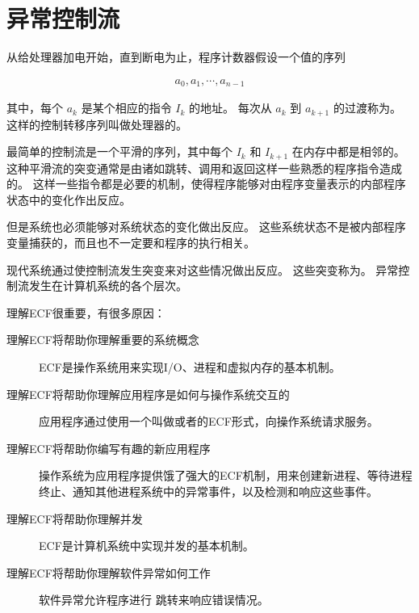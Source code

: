
\chapter{异常控制流}
{
    从给处理器加电开始，直到断电为止，程序计数器假设一个值的序列

    \begin{align*}
        a_0, a_1, \cdots, a_{n -1}
    \end{align*}

    其中，每个 $a_k$ 是某个相应的指令 $I_k$ 的地址。
    每次从 $a_k$ 到 $a_{k + 1}$ 的过渡称为。
    这样的控制转移序列叫做处理器的。

    最简单的控制流是一个平滑的序列，其中每个 $I_k$ 和 $I_{k + 1}$ 在内存中都是相邻的。
    这种平滑流的突变通常是由诸如跳转、调用和返回这样一些熟悉的程序指令造成的。
    这样一些指令都是必要的机制，使得程序能够对由程序变量表示的内部程序状态中的变化作出反应。

    但是系统也必须能够对系统状态的变化做出反应。
    这些系统状态不是被内部程序变量捕获的，而且也不一定要和程序的执行相关。

    现代系统通过使控制流发生突变来对这些情况做出反应。
    这些突变称为。
    异常控制流发生在计算机系统的各个层次。

    理解ECF很重要，有很多原因：

    \begin{description}
        \item[理解ECF将帮助你理解重要的系统概念] ECF是操作系统用来实现I/O、进程和虚拟内存的基本机制。
        \item[理解ECF将帮助你理解应用程序是如何与操作系统交互的] 应用程序通过使用一个叫做或者的ECF形式，向操作系统请求服务。
        \item[理解ECF将帮助你编写有趣的新应用程序] 操作系统为应用程序提供饿了强大的ECF机制，用来创建新进程、等待进程终止、通知其他进程系统中的异常事件，以及检测和响应这些事件。
        \item[理解ECF将帮助你理解并发] ECF是计算机系统中实现并发的基本机制。
        \item[理解ECF将帮助你理解软件异常如何工作] 软件异常允许程序进行 跳转来响应错误情况。
    \end{description}

    
    
    
    
    
    
}

\cleardoublepage

\endinput
